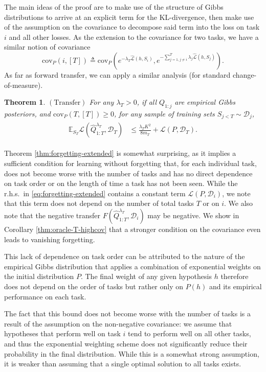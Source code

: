 \documentclass{article}
\theoremstyle{plain}
\newtheorem{theorem}{Theorem}[section]
\theoremstyle{definition}
\theoremstyle{remark}
\begin{document}
The main ideas of the proof are to make use of the structure of Gibbs distributions to arrive at an explicit term for the KL-divergence, then make use of the assumption on the covariance to decompose said term into the loss on task $i$ and all other losses.
As the extension to the covariance for two tasks, we have a similar notion of covariance 
$$\mathrm{cov}_{P}(i, [T])\triangleq\mathrm{cov}_{P}(e^{-\lambda_T\hat{\mathcal{L}}(h,S_i)}, e^{-\sum_{j=1,j\neq i}^{T}\lambda_j\hat{\mathcal{L}}(h,S_j)}).$$
%
As far as forward transfer, we can apply a similar analysis (for standard change-of-measure). 
%
\begin{theorem} $\mathrm{(Transfer)}$ 
For any $\lambda_T>0$, if all $Q_{1:j}$ are empirical Gibbs posteriors,
and $\mathrm{cov}_{P}(T, [T])\geq 0$,
for any sample of training sets $S_{j< T}\sim \mathcal{D}_j$,
%
\begin{align} 
\begin{split}
\mathbb{E}_{S_T}\mathcal{L}(\hat{Q}^{\lambda_T}_{1:T}, \mathcal{D}_T) &\leq \frac{\lambda_T K^2}{8m_T}+\mathcal{L}(P,\mathcal{D}_T) .
\end{split}
\end{align}
\end{theorem}
%
Theorem \ref{thm:forgetting-extended} is somewhat surprising, as it implies a sufficient condition for learning without forgetting that, for each individual task, does not become worse with the number of tasks and has no direct dependence on task order or on the length of time a task has not been seen. While the r.h.s.~in \eqref{eq:forgetting-extended} contains a constant term $\mathcal{L}(P,\mathcal{D}_i)$, we note that this term does not depend on the number of total tasks $T$ or on $i$. We also note that the negative transfer $F(\hat{Q}^{\lambda_T}_{1:T}, \mathcal{D}_i)$ may be negative. We show in Corollary \ref{thm:oracle-T-highcov} that a stronger condition on the covariance even leads to vanishing forgetting.

This lack of dependence on task order can be attributed to the nature of the empirical Gibbs distribution that applies a combination of exponential weights on the initial distribution $P$. The final weight of any given hypothesis $h$ therefore does not depend on the order of tasks but rather only on $P(h)$ and its empirical performance on each task.

The fact that this bound does not become worse with the number of tasks is a result of the assumption on the non-negative covariance: we assume that hypotheses that perform well on task $i$ tend to perform well on all other tasks, and thus the exponential weighting scheme does not significantly reduce their probability in the final distribution. While this is a somewhat strong assumption, it is weaker than assuming that a single optimal solution to all tasks exists.
\end{document}
